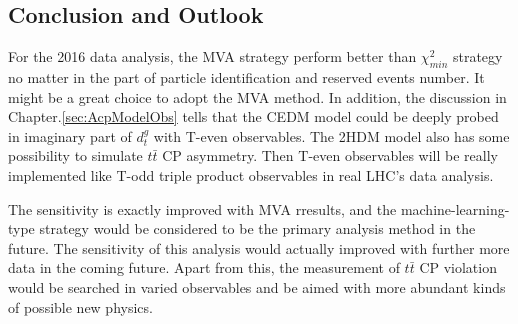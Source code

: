 	\subsection{Conclusion and Outlook}
	\label{ssec:Result_Conclusion}
		For the 2016 data analysis, the MVA strategy perform better than $\chi_{min}^2$ strategy no matter in the part of particle identification and reserved events number. It might be a great choice to adopt the MVA method. In addition, the discussion in Chapter.\ref{sec:AcpModelObs} tells that the CEDM model could be deeply probed in imaginary part of $d_t^g$ with T-even observables. The 2HDM model also has some possibility to simulate $t\bar{t}$ CP asymmetry. Then T-even observables will be really implemented like T-odd triple product observables in real LHC's data analysis. 

		The sensitivity is exactly improved with MVA rresults, and the machine-learning-type strategy would be considered to be the primary analysis method in the future. The sensitivity of this analysis would actually improved with further more data in the coming future. Apart from this, the measurement of $t\bar{t}$ CP violation would be searched in varied observables and be aimed with more abundant kinds of possible new physics.
		

\FloatBarrier
